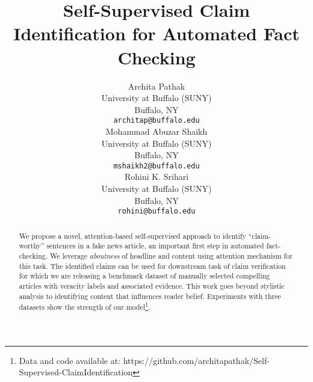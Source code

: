 \documentclass[11pt,a4paper]{article}
\title{Self-Supervised Claim Identification for Automated Fact Checking}
\author{Archita Pathak \\
  University at Buffalo (SUNY) \\
  Buffalo, NY \\
  \texttt{architap@buffalo.edu} \\\And
  Mohammad Abuzar Shaikh \\
  University at Buffalo (SUNY) \\
  Buffalo, NY \\
  \texttt{mshaikh2@buffalo.edu} \\\And
  Rohini K. Srihari \\
  University at Buffalo (SUNY) \\
  Buffalo, NY \\
  \texttt{rohini@buffalo.edu} \\}
\date{}
\begin{document}
\maketitle
\begin{abstract}
We propose a novel, attention-based self-supervised approach to identify ``claim-worthy'' sentences in a fake news article, an important first step in automated fact-checking. We leverage \textit{aboutness} of headline and content using attention mechanism for this task. The identified claims can be used for downstream task of claim verification for which we are releasing a benchmark dataset of manually selected compelling articles with veracity labels and associated evidence. This work goes beyond stylistic analysis to identifying content that influences reader belief. Experiments with three datasets show the strength of our model\footnote{Data and code available at: https://github.com/architapathak/Self-Supervised-ClaimIdentification}.
\end{abstract}
\end{document}
